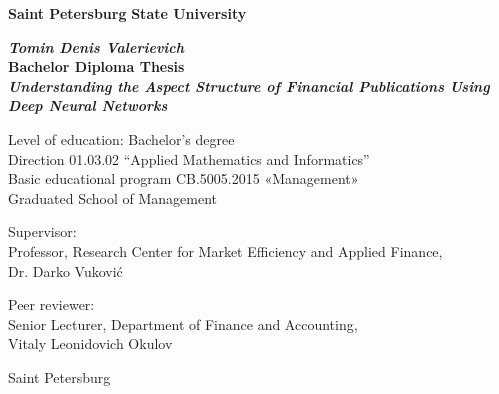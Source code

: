 \begin{titlepage}
\begin{center}

\textbf{Saint Petersburg}
\textbf{State University}

\vspace{35mm}

\textbf{\textit{\large Tomin Denis Valerievich}} \\[8mm]
\textbf{\large Bachelor Diploma Thesis}\\[3mm]
\textbf{\textit{\large Understanding the Aspect Structure of Financial Publications Using Deep Neural Networks}}

\vspace{20mm}
Level of education: Bachelor's degree\\
Direction 01.03.02 “Applied Mathematics and Informatics”\\
Basic educational program CB.5005.2015
«Management»\\
Graduated School of Management\\[25mm]


\begin{flushright}
\begin{minipage}[t]{0.65\textwidth}
{Supervisor:} \\
Professor, Research Center for Market Efficiency and Applied Finance, \\ Dr. Darko Vuković

\vspace{10mm}

{Peer reviewer:} \\
Senior Lecturer, Department of Finance and Accounting, \\ Vitaly Leonidovich Okulov
\end{minipage}
\end{flushright}

\vfill

{Saint Petersburg}
\par{\the\year{}}
\end{center}
\end{titlepage}
\restoregeometry
\addtocounter{page}{1}